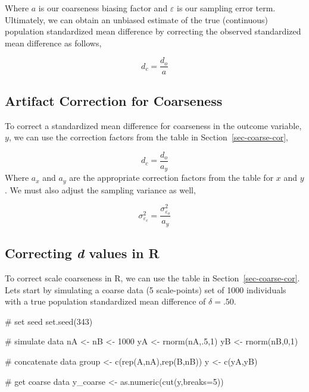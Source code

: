 \documentclass[
  letterpaper,
  DIV=11,
  numbers=noendperiod]{scrreprt}
\newenvironment{Shaded}{\begin{snugshade}}{\end{snugshade}}
\newcommand{\AttributeTok}[1]{\textcolor[rgb]{0.40,0.45,0.13}{#1}}
\newcommand{\CommentTok}[1]{\textcolor[rgb]{0.37,0.37,0.37}{#1}}
\newcommand{\DecValTok}[1]{\textcolor[rgb]{0.68,0.00,0.00}{#1}}
\newcommand{\FunctionTok}[1]{\textcolor[rgb]{0.28,0.35,0.67}{#1}}
\newcommand{\NormalTok}[1]{\textcolor[rgb]{0.00,0.23,0.31}{#1}}
\newcommand{\OtherTok}[1]{\textcolor[rgb]{0.00,0.23,0.31}{#1}}
\newcommand{\StringTok}[1]{\textcolor[rgb]{0.13,0.47,0.30}{#1}}
\begin{document}
Where \(a\) is our coarseness biasing factor and \(\varepsilon\) is our
sampling error term. Ultimately, we can obtain an unbiased estimate of
the true (continuous) population standardized mean difference by
correcting the observed standardized mean difference as follows,

\[
d_c = \frac{d_o}{a}
\]

\hypertarget{artifact-correction-for-coarseness}{%
\subsection{Artifact Correction for
Coarseness}\label{artifact-correction-for-coarseness}}

To correct a standardized mean difference for coarseness in the outcome
variable, \(y\), we can use the correction factors from the table in
Section~\ref{sec-coarse-cor},

\[
d_c = \frac{d_o}{a_y}
\] Where \(a_x\) and \(a_y\) are the appropriate correction factors from
the table for \(x\) and \(y\). We must also adjust the sampling variance
as well,

\[
\sigma^2_{\varepsilon_c} = \frac{\sigma^2_{\varepsilon_o}}{a_y}
\]

\hypertarget{correcting-d-values-in-r-1}{%
\subsection{\texorpdfstring{Correcting \emph{d} values in
R}{Correcting d values in R}}\label{correcting-d-values-in-r-1}}

To correct scale coarseness in R, we can use the table in
Section~\ref{sec-coarse-cor}. Lets start by simulating a coarse data (5
scale-points) set of 1000 individuals with a true population
standardized mean difference of \(\delta = .50\).

\begin{Shaded}
\begin{Highlighting}[]
\CommentTok{\# set seed}
\FunctionTok{set.seed}\NormalTok{(}\DecValTok{343}\NormalTok{)}

\CommentTok{\# simulate data}
\NormalTok{nA }\OtherTok{\textless{}{-}}\NormalTok{ nB }\OtherTok{\textless{}{-}} \DecValTok{1000}
\NormalTok{yA }\OtherTok{\textless{}{-}} \FunctionTok{rnorm}\NormalTok{(nA,.}\DecValTok{5}\NormalTok{,}\DecValTok{1}\NormalTok{)}
\NormalTok{yB }\OtherTok{\textless{}{-}} \FunctionTok{rnorm}\NormalTok{(nB,}\DecValTok{0}\NormalTok{,}\DecValTok{1}\NormalTok{)}

\CommentTok{\# concatenate data}
\NormalTok{group }\OtherTok{\textless{}{-}} \FunctionTok{c}\NormalTok{(}\FunctionTok{rep}\NormalTok{(}\StringTok{\textquotesingle{}A\textquotesingle{}}\NormalTok{,nA),}\FunctionTok{rep}\NormalTok{(}\StringTok{\textquotesingle{}B\textquotesingle{}}\NormalTok{,nB))}
\NormalTok{y }\OtherTok{\textless{}{-}} \FunctionTok{c}\NormalTok{(yA,yB)}

\CommentTok{\# get coarse data}
\NormalTok{y\_coarse }\OtherTok{\textless{}{-}} \FunctionTok{as.numeric}\NormalTok{(}\FunctionTok{cut}\NormalTok{(y,}\AttributeTok{breaks=}\DecValTok{5}\NormalTok{)) }
\end{Highlighting}
\end{Shaded}
\end{document}
